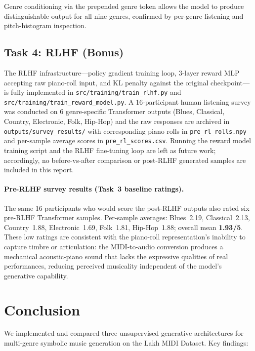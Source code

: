 \documentclass[letterpaper]{article}
\begin{document}
Genre conditioning via the prepended genre token allows the model to
produce distinguishable output for all nine genres, confirmed by
per-genre listening and pitch-histogram inspection.

\subsection{Task 4: RLHF (Bonus)}

The RLHF infrastructure---policy gradient training loop, 3-layer reward
MLP accepting raw piano-roll input, and KL penalty against the original
checkpoint---is fully implemented in
\texttt{src/training/train\_rlhf.py} and
\texttt{src/training/train\_reward\_model.py}.
A 16-participant human listening survey was conducted on 6 genre-specific
Transformer outputs (Blues, Classical, Country, Electronic, Folk, Hip-Hop)
and the raw responses are archived in
\texttt{outputs/survey\_results/} with corresponding piano rolls in
\texttt{pre\_rl\_rolls.npy} and per-sample average scores in
\texttt{pre\_rl\_scores.csv}.
Running the reward model training script and the RLHF fine-tuning loop
are left as future work; accordingly, no before-vs-after comparison
or post-RLHF generated samples are included in this report.

\paragraph{Pre-RLHF survey results (Task~3 baseline ratings).}
The same 16 participants who would score the post-RLHF outputs also rated
six pre-RLHF Transformer samples.
Per-sample averages: Blues~2.19, Classical~2.13, Country~1.88,
Electronic~1.69, Folk~1.81, Hip-Hop~1.88; overall mean \textbf{1.93/5}.
These low ratings are consistent with the piano-roll representation's
inability to capture timbre or articulation: the MIDI-to-audio
conversion produces a mechanical acoustic-piano sound that lacks the
expressive qualities of real performances, reducing perceived musicality
independent of the model's generative capability.

\section{Conclusion}
\label{sec:conclusion}

We implemented and compared three unsupervised generative architectures
for multi-genre symbolic music generation on the Lakh MIDI Dataset.  Key
findings:
\end{document}
